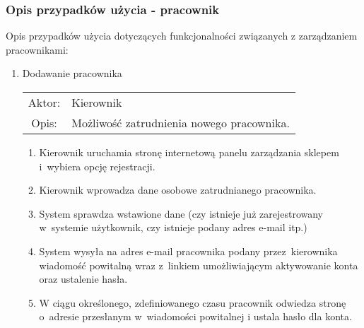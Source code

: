 \subsubsection{Opis przypadków użycia - pracownik}

Opis przypadków użycia dotyczących funkcjonalności związanych z zarządzaniem
pracownikami:

\begin{enumerate}
  
  \item Dodawanie pracownika \\
  \begin{tabularx}{\linewidth}{ c X }
  Aktor: & Kierownik \\
  Opis: & Możliwość zatrudnienia nowego pracownika.\\
  \end{tabularx}
   \begin{enumerate}
    \item Kierownik uruchamia stronę internetową panelu zarządzania sklepem
    i~wybiera opcję rejestracji.
    \item Kierownik wprowadza dane osobowe zatrudnianego pracownika.
    \item System sprawdza wstawione dane (czy istnieje już zarejestrowany
    w~systemie użytkownik, czy istnieje podany adres e-mail itp.)
    \item System wysyła na adres e-mail pracownika podany przez~kierownika
    wiadomość powitalną wraz z~linkiem umożliwiającym aktywowanie konta oraz
    ustalenie hasła.
    \item W ciągu określonego, zdefiniowanego czasu pracownik odwiedza stronę
    o~adresie przesłanym w~wiadomości powitalnej i ustala hasło dla konta.
  \end{enumerate}


\end{enumerate}
